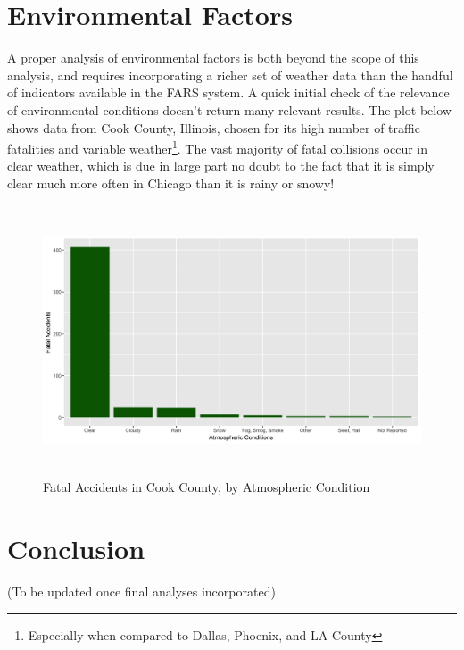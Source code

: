 \documentclass[11pt, oneside,titlepage]{article}   	%
\begin{document}
\section*{Environmental Factors}
A proper analysis of environmental factors is both beyond the scope of this analysis, and requires incorporating a richer set of weather data than the handful of indicators available in the FARS system. A quick initial check of the relevance of environmental conditions doesn't return many relevant results. The plot below shows data from Cook County, Illinois, chosen for its high number of traffic fatalities and variable weather\footnote{Especially when compared to Dallas, Phoenix, and LA County}. The vast majority of fatal collisions occur in clear weather, which is due in large part no doubt to the fact that it is simply clear much more often in Chicago than it is rainy or snowy! 

\begin{figure}[H]
\centering
  \includegraphics[width=15cm,height=8cm,keepaspectratio]{Environmental.png}
\caption{Fatal Accidents in Cook County, by Atmospheric Condition}
\end{figure}


\section*{Conclusion}

(To be updated once final analyses incorporated)
\end{document}
